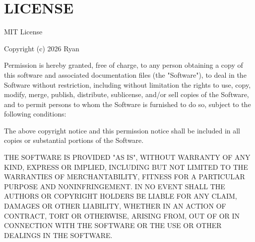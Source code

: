 \chapter{LICENSE }
\hypertarget{md__l_i_c_e_n_s_e}{}\label{md__l_i_c_e_n_s_e}
MIT License

Copyright (c) 2026 Ryan

Permission is hereby granted, free of charge, to any person obtaining a copy of this software and associated documentation files (the "{}\+Software"{}), to deal in the Software without restriction, including without limitation the rights to use, copy, modify, merge, publish, distribute, sublicense, and/\+or sell copies of the Software, and to permit persons to whom the Software is furnished to do so, subject to the following conditions:\+

The above copyright notice and this permission notice shall be included in all copies or substantial portions of the Software.

THE SOFTWARE IS PROVIDED "{}\+AS IS"{}, WITHOUT WARRANTY OF ANY KIND, EXPRESS OR IMPLIED, INCLUDING BUT NOT LIMITED TO THE WARRANTIES OF MERCHANTABILITY, FITNESS FOR A PARTICULAR PURPOSE AND NONINFRINGEMENT. IN NO EVENT SHALL THE AUTHORS OR COPYRIGHT HOLDERS BE LIABLE FOR ANY CLAIM, DAMAGES OR OTHER LIABILITY, WHETHER IN AN ACTION OF CONTRACT, TORT OR OTHERWISE, ARISING FROM, OUT OF OR IN CONNECTION WITH THE SOFTWARE OR THE USE OR OTHER DEALINGS IN THE SOFTWARE. 